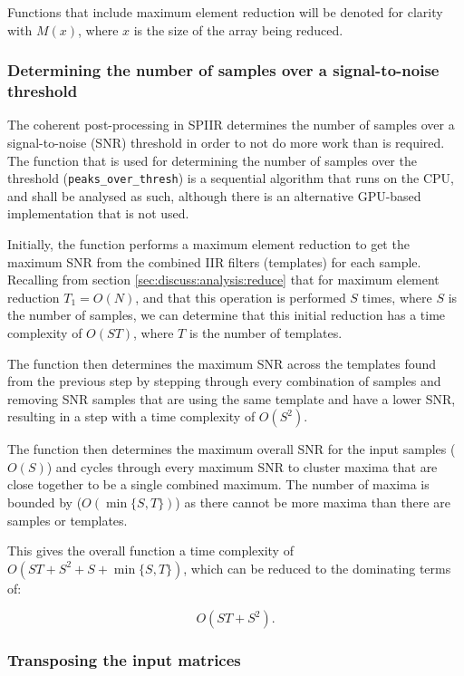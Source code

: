 \documentclass{article}
\begin{document}
Functions that include maximum element reduction will be denoted for clarity with \(M(x)\), where \(x\) is the size of the array being reduced.

\subsubsection{Determining the number of samples over a signal-to-noise threshold} \label{sec:discuss:analysis:peaks}

The coherent post-processing in SPIIR determines the number of samples over a signal-to-noise (SNR) threshold in order to not do more work than is required.
The function that is used for determining the number of samples over the threshold (\texttt{peaks\_over\_thresh}) is a sequential algorithm that runs on the CPU, and shall be analysed as such, although there is an alternative GPU-based implementation that is not used.

Initially, the function performs a maximum element reduction to get the maximum SNR from the combined IIR filters (templates) for each sample.
Recalling from section \ref{sec:discuss:analysis:reduce} that for maximum element reduction \(T_1 = O(N)\), and that this operation is performed \(S\) times, where \(S\) is the number of samples, we can determine that this initial reduction has a time complexity of \(O(ST)\), where \(T\) is the number of templates.

The function then determines the maximum SNR across the templates found from the previous step by stepping through every combination of samples and removing SNR samples that are using the same template and have a lower SNR, resulting in a step with a time complexity of \(O(S^2)\).

The function then determines the maximum overall SNR for the input samples (\(O(S)\)) and cycles through every maximum SNR to cluster maxima that are close together to be a single combined maximum.
The number of maxima is bounded by (\(O(\min\{S,T\})\)) as there cannot be more maxima than there are samples or templates.

This gives the overall function a time complexity of \(O(ST + S^2 + S + \min\{S,T\})\), which can be reduced to the dominating terms of:

\[
    O(ST + S^2).
\]

\subsubsection{Transposing the input matrices} \label{sec:discuss:analysis:transpose}
\end{document}
